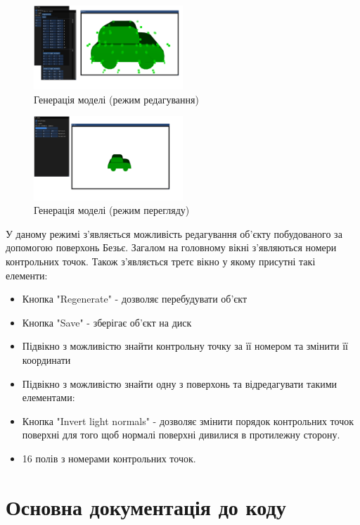 \let\mypdfximage\pdfximage\def\pdfximage{\immediate\mypdfximage}\documentclass[14pt,a4paper]{extarticle}
\theoremstyle{definition}
\renewcommand{\[}{\begin{singlespace}\begin{equation*}}
\renewcommand{\]}{\end{equation*}\end{singlespace}}
\renewcommand{\+}{\discretionary{\mbox{\scriptsize$\hookleftarrow$}}{}{}}
\begin{document}
\begin{figure}[!htb]
    \centering
    \includegraphics[width=0.5\textwidth]{edit-car.png}
    \caption{Генерація моделі (режим редагування)}\label{fig:edit-car}
\end{figure}

\begin{figure}[!htb]
    \centering
    \includegraphics[width=0.5\textwidth]{car-view.png}
    \caption{Генерація моделі (режим перегляду)}\label{fig:car-view}
\end{figure}

У даному режимі з'являється можливість редагування об'єкту побудованого за допомогою поверхонь Безьє. Загалом на головному вікні з'являються номери контрольних точок. Також з'являється третє вікно у якому присутні такі елементи:

\begin{itemize}
\item Кнопка "Regenerate" - дозволяє перебудувати об'єкт
\item Кнопка "Save" - зберігає об'єкт на диск
\item Підвікно з можливістю знайти контрольну точку за її номером та змінити її координати
\item Підвікно з можливістю знайти одну з поверхонь та відредагувати такими елементами:
\item Кнопка "Invert light normals" - дозволяє змінити порядок контрольних точок поверхні для того щоб нормалі поверхні дивилися в протилежну сторону.
\item 16 полів з номерами контрольних точок.
\end{itemize}

\section{Основна документація до коду}
\end{document}
